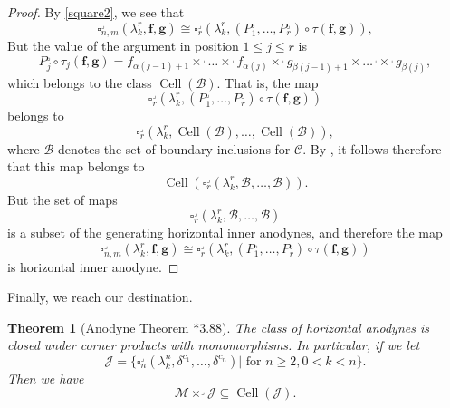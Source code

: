 \documentclass[leqno]{article}
\numberwithin{equation}{subsection}
\theoremstyle{plain}   %
\newtheorem{thm}[equation]{Theorem}
\theoremstyle{remark}
\theoremstyle{plain}
\providecommand{\C}{}
\renewcommand{\C}{\ensuremath{\mathcal{C}}}
\begin{document}
\begin{proof}
	By \ref{square2}, we see that 
	\[
		\square^\lrcorner_{n,m}(\lambda^r_k,\mathbf{f},\mathbf{g}) \cong \square^\lrcorner_r(\lambda^r_k, (P_1^\lrcorner,\dots, P_r^\lrcorner) \circ \tau(\mathbf{f},\mathbf{g})),
	\]
	But the value of the argument in position \(1\leq j \leq r\) is 
	\[
		P_j^\lrcorner\circ \tau_j(\mathbf{f},\mathbf{g})=f_{\alpha(j-1)+1}\times^\lrcorner \dots \times^\lrcorner f_{\alpha(j)} \times^\lrcorner g_{\beta(j-1)+1}\times \dots^\lrcorner \times^\lrcorner g_{\beta(j)},
	\]
	which belongs to the class \(\operatorname{Cell}(\mathscr{B})\). That is, the map 
	\[
		\square^\lrcorner_r(\lambda^r_k, (P_1^\lrcorner,\dots, P_r^\lrcorner) \circ \tau(\mathbf{f},\mathbf{g}))
	\]
	belongs to 
	\[
		\square^\lrcorner_{r}(\lambda^r_k, \operatorname{Cell}(\mathscr{B}), \dots, \operatorname{Cell}(\mathscr{B})),
	\]
	where \(\mathscr{B}\) denotes the set of boundary inclusions for \(\C\).  By , it follows therefore that this map belongs to 
	\[
		\operatorname{Cell}(\square^\lrcorner_{r}(\lambda^r_k, \mathscr{B}, \dots, \mathscr{B})).
	\]
	But the set of maps
	\[
		\square^\lrcorner_{r}(\lambda^r_k, \mathscr{B}, \dots, \mathscr{B})
	\]
	is a subset of the generating horizontal inner anodynes, and therefore the map
	\[
		\square^\lrcorner_{n,m}(\lambda^r_k,\mathbf{f},\mathbf{g})\cong \square^\lrcorner_r(\lambda^r_k, (P_1^\lrcorner,\dots, P_r^\lrcorner) \circ \tau(\mathbf{f},\mathbf{g}))
	\]
	is horizontal inner anodyne.
\end{proof}
Finally, we reach our destination.
\begin{thm}[Anodyne Theorem \cite{oury}*{3.88}]\label{anodynethm}
	The class of horizontal anodynes is closed under corner products with monomorphisms.  In particular, if we let \[\mathscr{J}=\{\square_n^\lrcorner(\lambda^n_k, \delta^{c_1},\dots,\delta^{c_n})| \text{ for } n\geq 2, 0<k<n\}.\] Then we have
	\[\mathscr{M}\times^\lrcorner \mathscr{J} \subseteq \operatorname{Cell}(\mathscr{J}).\]
\end{thm}
\end{document}
